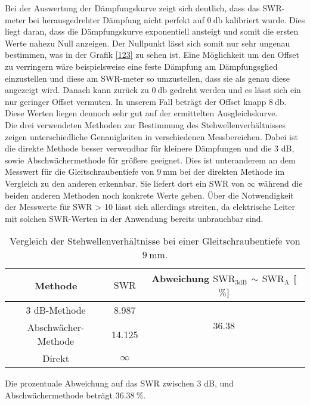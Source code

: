 \newline
Bei der Auswertung der Dämpfungskurve zeigt sich deutlich, dass das SWR-meter bei herausgedrehter Dämpfung nicht perfekt auf $\SI{0}{\decibel}$ kalibriert wurde. 
Dies liegt daran, dass die Dämpfungskurve exponentiell ansteigt und somit die ersten Werte nahezu Null anzeigen. Der Nullpunkt lässt sich somit nur sehr
ungenau bestimmen, was in der Grafik \ref{123} zu sehen ist. Eine Möglichkeit um den Offset zu verringern wäre beispielsweise eine feste Dämpfung am
Dämpfungsglied einzustellen und diese am SWR-meter so umzustellen, dass sie als genau diese angezeigt wird. Danach kann zurück zu $\SI{0}{\decibel}$ gedreht werden und
es lässt sich ein nur geringer Offset vermuten. 
In unserem Fall beträgt der Offset knapp $\SI{8}{\decibel}$. Diese Werten liegen dennoch sehr gut auf der ermittelten Ausgleichskurve.
\\
\newline
Die drei verwendeten Methoden zur Bestimmung des Stehwellenverhältnisses zeigen unterschiedliche Genauigkeiten in verschiedenen Messbereichen. Dabei ist die direkte Methode besser verwendbar
für kleinere Dämpfungen und die 3 dB, sowie Abschwächermethode für größere geeignet. Dies ist unteranderem an dem Messwert für die Gleitschraubentiefe von $\SI{9}{\milli\meter}$ 
bei der direkten Methode im Vergleich zu den anderen erkennbar. Sie liefert dort ein SWR von $\infty$ während die beiden anderen Methoden noch konkrete Werte geben. 
Über die Notwendigkeit der Messwerte für SWR > 10 lässt sich allerdings streiten, da elektrische Leiter mit solchen SWR-Werten in der Anwendung bereits unbrauchbar sind.
\begin{table}
    \centering
    \caption{Vergleich der Stehwellenverhältnisse bei einer Gleitschraubentiefe von $ \SI{9}{\milli\meter}$.}
    \label{tab:1}
    \begin{tabular}{c  c || c }
        \toprule
        Methode & $\text{SWR}$ & Abweichung \hspace{0.5cm} $\text{SWR}_{\text{3dB}}$ $\sim$ $\text{SWR}_{\text{A}}$ \hspace{0.5cm} [$\%$]  \\
        \midrule
         3 dB-Methode        & 8.987 & \multirow{2}{*}{36.38} \\
         Abschwächer-Methode & 14.125 & \\ 
         Direkt              & $ \infty$ & \\ 
     \end{tabular}
\end{table}
\begin{flushleft}
Die prozentuale Abweichung auf das SWR zwischen 3 dB, und Abschwächermethode beträgt $\SI{36.38}{\percent}$. 
\end{flushleft}